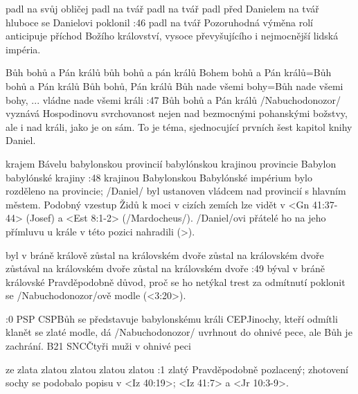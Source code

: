     {padl na svůj obličej} %
    {padl na tvář}  %
    {padl na tvář} %
    {padl před Danielem na tvář}  %
    {hluboce se Danielovi poklonil}  %
:46 {padl na tvář} Pozoruhodná výměna rolí anticipuje příchod Božího království, vysoce převyšujícího i nejmocnější lidská impéria.

    {Bůh bohů a Pán králů} %
    {bůh bohů a pán králů}  %
    {Bohem bohů a Pán králů}={Bůh bohů a Pán králů} %
    {Bůh bohů, Pán králů}  %
    {Bůh nade všemi bohy}={Bůh nade všemi bohy, ... vládne nade všemi králi}  %
:47 {Bůh bohů a Pán králů} \x/Nabuchodonozor/ vyznává Hospodinovu svrchovanost nejen nad bezmocnými pohanskými božstvy, ale i nad králi, jako je on sám. To je téma, sjednocující prvních šest kapitol knihy Daniel.

    {krajem Bávelu} %
    {babylonskou provincií}  %
    {babylónskou krajinou} %
    {provincie Babylon}  %
    {babylónské krajiny}  %
:48 {krajinou Babylonskou} Babylónské impérium bylo rozděleno na provincie;  \x/Daniel/ byl ustanoven vládcem nad provincií s hlavním městem. Podobný vzestup Židů k moci v cizích zemích lze vidět v <Gn 41:37-44> (Josef) a <Est 8:1-2> (\x/Mardocheus/). \x/Daniel/ovi přátelé ho na jeho přímluvu u krále v této pozici nahradili (>).

    {byl v bráně králově} %
    {zůstal na královském dvoře}  %
    {zůstal na královském dvoře} %
    {zůstával na královském dvoře}  %
    {zůstal na královském dvoře}  %
:49 {býval v bráně královské} Pravděpodobně důvod, proč se ho netýkal trest za odmítnutí poklonit se \x/Nabuchodonozor/ově modle (<3:20>).

:0 {} 
% 
        {PSP}{}%
        {CSP}{Bůh se představuje babylonskému králi}%
        {CEP}{Jinochy, kteří odmítli klanět se zlaté modle, dá \x/Nabuchodonozor/
             uvrhnout do ohnivé pece, ale Bůh je zachrání.}%
        {B21}{}%
        {SNC}{Čtyři muži v ohnivé peci}%

             

    {ze zlata} %
    {zlatou}  %
    {zlatou} %
    {zlatou}  %
    {zlatou}  %
:1 {zlatý}  Pravděpodobně pozlacený; zhotovení sochy se podobalo popisu v <Iz 40:19>; <Iz 41:7> a  <Jr 10:3-9>.

